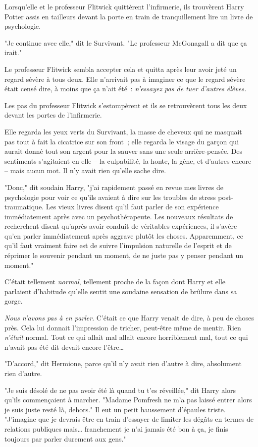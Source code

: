 Lorsqu'elle et le professeur Flitwick quittèrent l'infirmerie, ils trouvèrent Harry Potter assis en tailleurs devant la porte en train de tranquillement lire un livre de psychologie.

"Je continue avec elle," dit le Survivant. "Le professeur McGonagall a dit que ça irait."

Le professeur Flitwick sembla accepter cela et quitta après leur avoir jeté un regard sévère à tous deux. Elle n'arrivait pas à imaginer ce que le regard sévère était censé dire, à moins que ça n'ait été~: \emph{n'essayez pas de tuer d'autres élèves.}

Les pas du professeur Flitwick s'estompèrent et ils se retrouvèrent tous les deux devant les portes de l'infirmerie.

Elle regarda les yeux verts du Survivant, la masse de cheveux qui ne masquait pas tout à fait la cicatrice sur son front~; elle regarda le visage du garçon qui aurait donné tout son argent pour la sauver sans une seule arrière-pensée. Des sentiments s'agitaient en elle -- la culpabilité, la honte, la gêne, et d'autres encore -- mais aucun mot. Il n'y avait rien qu'elle sache dire.

"Donc," dit soudain Harry, "j'ai rapidement passé en revue mes livres de psychologie pour voir ce qu'ils avaient à dire sur les troubles de stress post-traumatique. Les vieux livres disent qu'il faut parler de son expérience immédiatement après avec un psychothérapeute. Les nouveaux résultats de recherchent disent qu'après avoir conduit de véritables expériences, il s'avère qu'en parler immédiatement après aggrave plutôt les choses. Apparemment, ce qu'il faut vraiment faire est de suivre l'impulsion naturelle de l'esprit et de réprimer le souvenir pendant un moment, de ne juste pas y penser pendant un moment."

C'était tellement \emph{normal}, tellement proche de la façon dont Harry et elle parlaient d'habitude qu'elle sentit une soudaine sensation de brûlure dans sa gorge.

\emph{Nous n'avons pas à en parler}. C'était ce que Harry venait de dire, à peu de choses près. Cela lui donnait l'impression de tricher, peut-être même de mentir. Rien \emph{n'était} normal. Tout ce qui allait mal allait encore horriblement mal, tout ce qui n'avait pas été dit devait encore l'être…

"D'accord," dit Hermione, parce qu'il n'y avait rien d'autre à dire, absolument rien d'autre.

"Je suis désolé de ne pas avoir été là quand tu t'es réveillée," dit Harry alors qu'ils commençaient à marcher. "Madame Pomfresh ne m'a pas laissé entrer alors je suis juste resté là, dehors." Il eut un petit haussement d'épaules triste. "J'imagine que je devrais être en train d'essayer de limiter les dégâts en termes de relations publiques mais… franchement je n'ai jamais été bon à ça, je finis toujours par parler durement aux gens."


